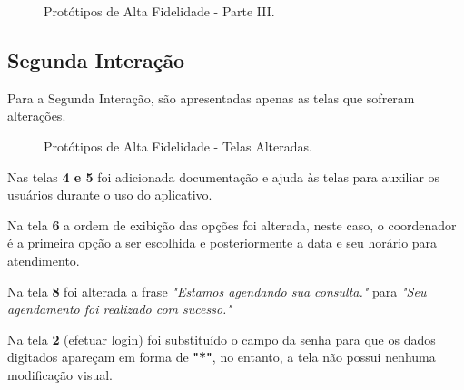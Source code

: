 			\begin{figure}[!htb]
				\centering
				\caption[Protótipos de Alta Fidelidade - Parte III]{Protótipos de Alta Fidelidade - Parte III.}
				\label{fig03-1int}
			\end{figure}
		

		\newpage
		\begin{landscape}
		\subsection[Segunda Interação]{Segunda Interação}
		\label{sec:prototipos_alta_2}
			
			Para a Segunda Interação, são apresentadas apenas as telas que sofreram alterações.

			\begin{figure}[!htb]
				\centering
				\quad %
				\quad
				\quad
				\caption[Protótipos de Alta Fidelidade - Telas Alteradas]{Protótipos de Alta Fidelidade - Telas Alteradas.}
				\label{fig03-2int}
			\end{figure}

		Nas telas \textbf{4 e 5} foi adicionada documentação e ajuda às telas para auxiliar os usuários durante o uso do aplicativo.
		
		Na tela \textbf{6} a ordem de exibição das opções foi alterada, neste caso, o coordenador é a primeira opção a ser escolhida e posteriormente a data e seu horário para atendimento.
		
		Na tela \textbf{8} foi alterada a frase \emph{"Estamos agendando sua consulta."} para \emph{"Seu agendamento foi realizado com sucesso."}
		
		Na tela \textbf{2} (efetuar login) foi substituído o campo da senha para que os dados digitados apareçam em forma de \textbf{"*"}, no entanto, a tela não possui nenhuma modificação visual.
		\end{landscape}